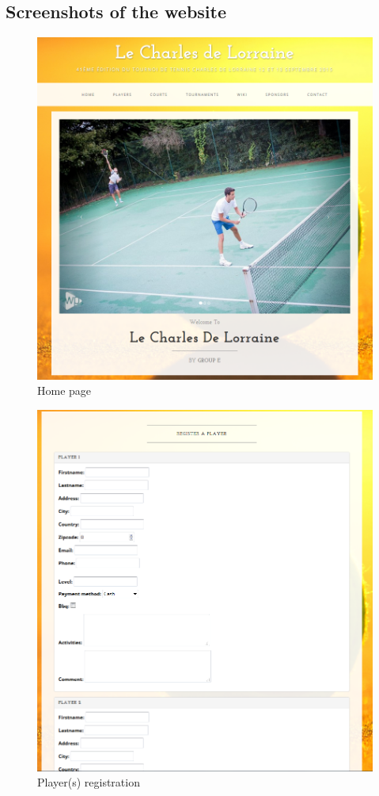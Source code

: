 \documentclass[a4paper, 12pt]{article}
\begin{document}
\begin{appendices}
\section*{Screenshots of the website}
\noindent
\begin{figure}[b]
\caption{\label{figure2} Home page}
\includegraphics[scale=0.7]{site1.PNG}
\end{figure}

\begin{figure}
\caption{\label{figure3} Player(s) registration}
\includegraphics[scale=0.8]{site2.PNG}
\end{figure}


\end{appendices}
\end{document}
